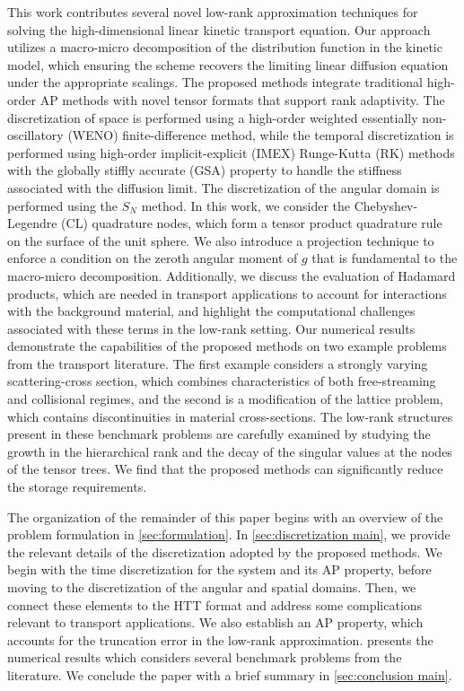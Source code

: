 \documentclass[onefignum,onetabnum]{siamart220329}
\begin{document}
This work contributes several novel low-rank approximation techniques for solving the high-dimensional linear kinetic transport equation. Our approach utilizes a macro-micro decomposition of the distribution function in the kinetic model, which ensuring the scheme recovers the limiting linear diffusion equation under the appropriate scalings. The proposed methods integrate traditional high-order AP methods with novel tensor formats that support rank adaptivity. The discretization of space is performed using a high-order weighted essentially non-oscillatory (WENO) finite-difference method, while the temporal discretization is performed using high-order implicit-explicit (IMEX) Runge-Kutta (RK) methods with the globally stiffly accurate (GSA) property to handle the stiffness associated with the diffusion limit. The discretization of the angular domain is performed using the $S_{N}$ method. In this work, we consider the Chebyshev-Legendre (CL) quadrature nodes, which form a tensor product quadrature rule on the surface of the unit sphere. We also introduce a projection technique to enforce a condition on the zeroth angular moment of $g$ that is fundamental to the macro-micro decomposition. Additionally, we discuss the evaluation of Hadamard products, which are needed in transport applications to account for interactions with the background material, and highlight the computational challenges associated with these terms in the low-rank setting. Our numerical results demonstrate the capabilities of the proposed methods on two example problems from the transport literature. The first example considers a strongly varying scattering-cross section, which combines characteristics of both free-streaming and collisional regimes, and the second is a modification of the lattice problem, which contains discontinuities in material cross-sections. The low-rank structures present in these benchmark problems are carefully examined by studying the growth in the hierarchical rank and the decay of the singular values at the nodes of the tensor trees. We find that the proposed methods can significantly reduce the storage requirements.

The organization of the remainder of this paper begins with an overview of the problem formulation in \cref{sec:formulation}. In \cref{sec:discretization main}, we provide the relevant details of the discretization adopted by the proposed methods. We begin with the time discretization for the system and its AP property, before moving to the discretization of the angular and spatial domains. Then, we connect these elements to the HTT format and address some complications relevant to transport applications. We also establish an AP property, which accounts for the truncation error in the low-rank approximation.  presents the numerical results which considers several benchmark problems from the literature. We conclude the paper with a brief summary in \cref{sec:conclusion main}.
\end{document}
